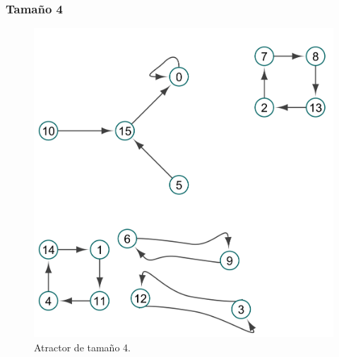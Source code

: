 \documentclass[11pt]{article}
\begin{document}
			\subsubsection{Tamaño 4}
			\begin{figure}[H]
			\centering
			\includegraphics[scale=0.08]{resources/Atractores54/atractor_54_size_4.png}
			\caption{Atractor de tamaño 4.}\label{fig:picture}
			\end{figure}
\end{document}
